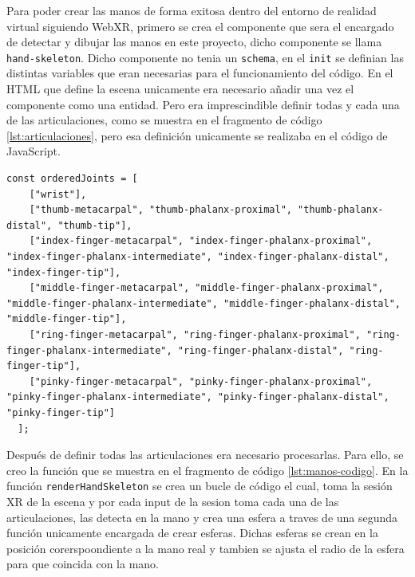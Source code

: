 \documentclass[a4paper, 12pt]{book}
\begin{document}
Para poder crear las manos de forma exitosa dentro del entorno de realidad virtual siguiendo WebXR, primero se crea el componente que sera el encargado de detectar y dibujar las manos en este proyecto, dicho componente se llama \texttt{hand-skeleton}. Dicho componente no tenia un \texttt{schema}, en el \texttt{init} se definian las distintas variables que eran necesarias para el funcionamiento del código. 
En el HTML que define la escena unicamente era necesario añadir una vez el componente como una entidad. Pero era imprescindible definir todas y cada una de las articulaciones, como se muestra en el fragmento de código \ref{lst:articulaciones}, pero esa definición unicamente se realizaba en el código de JavaScript.
\begin{lstlisting}[caption=Definición de articulaciones, captionpos=b, label=lst:articulaciones]
  const orderedJoints = [
    ["wrist"],
    ["thumb-metacarpal", "thumb-phalanx-proximal", "thumb-phalanx-distal", "thumb-tip"],
    ["index-finger-metacarpal", "index-finger-phalanx-proximal", "index-finger-phalanx-intermediate", "index-finger-phalanx-distal", "index-finger-tip"],
    ["middle-finger-metacarpal", "middle-finger-phalanx-proximal", "middle-finger-phalanx-intermediate", "middle-finger-phalanx-distal", "middle-finger-tip"],
    ["ring-finger-metacarpal", "ring-finger-phalanx-proximal", "ring-finger-phalanx-intermediate", "ring-finger-phalanx-distal", "ring-finger-tip"],
    ["pinky-finger-metacarpal", "pinky-finger-phalanx-proximal", "pinky-finger-phalanx-intermediate", "pinky-finger-phalanx-distal", "pinky-finger-tip"]
  ];
\end{lstlisting}
Después de definir todas las articulaciones era necesario procesarlas. 
Para ello, se creo la función que se muestra en el fragmento de código \ref{lst:manos-codigo}. En la función \texttt{renderHandSkeleton} se crea un bucle de código el cual, toma la sesión XR de la escena y por cada input de la sesion toma cada una de las articulaciones, las detecta en la mano y crea una esfera a traves de una segunda función unicamente encargada de crear esferas. Dichas esferas se crean en la posición corerspoondiente a la mano real
y tambien se ajusta el radio de la esfera para que coincida con la mano. 
\end{document}
